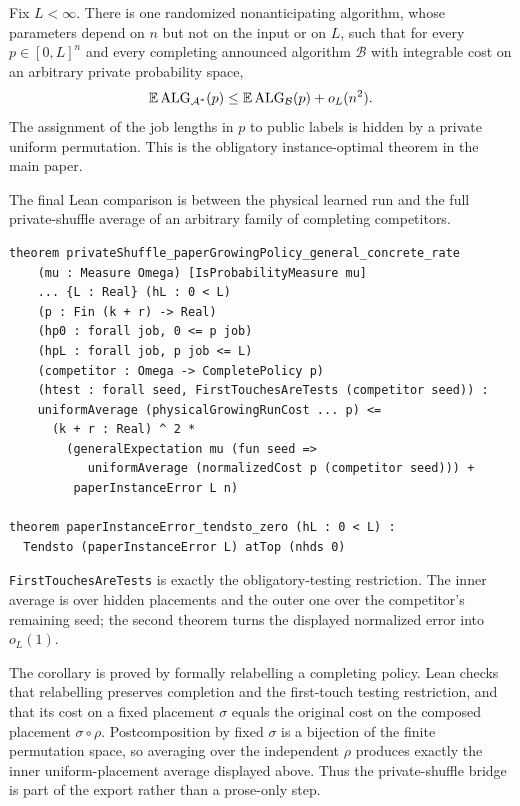 \begin{theorem}
\label{thm:lean-audit-obligatory-instance}
Fix $L<\infty$.  There is one randomized nonanticipating algorithm, whose
parameters depend on $n$ but not on the input or on $L$, such that for every
$p\in[0,L]^n$ and every completing announced algorithm $\mathcal B$ with
integrable cost on an arbitrary private probability space,
\[
 \mathbb{E}\operatorname{ALG}_{\mathcal A^*}(p)
 \le \mathbb{E}\operatorname{ALG}_{\mathcal B}(p)+o_L(n^2).
\]
The assignment of the job lengths in $p$ to public labels is hidden by a private
uniform permutation.  This is the obligatory instance-optimal theorem in the
main paper.
\end{theorem}

The final Lean comparison is between the physical learned run and the full
private-shuffle average of an arbitrary family of completing competitors.

\begin{lstlisting}[style=lean]
theorem privateShuffle_paperGrowingPolicy_general_concrete_rate
    (mu : Measure Omega) [IsProbabilityMeasure mu]
    ... {L : Real} (hL : 0 < L)
    (p : Fin (k + r) -> Real)
    (hp0 : forall job, 0 <= p job)
    (hpL : forall job, p job <= L)
    (competitor : Omega -> CompletePolicy p)
    (htest : forall seed, FirstTouchesAreTests (competitor seed)) :
    uniformAverage (physicalGrowingRunCost ... p) <=
      (k + r : Real) ^ 2 *
        (generalExpectation mu (fun seed =>
           uniformAverage (normalizedCost p (competitor seed))) +
         paperInstanceError L n)

theorem paperInstanceError_tendsto_zero (hL : 0 < L) :
  Tendsto (paperInstanceError L) atTop (nhds 0)
\end{lstlisting}

\texttt{FirstTouchesAreTests} is exactly the obligatory-testing restriction.
The inner average is over hidden placements and the outer one over the
competitor's remaining seed; the second theorem turns the displayed
normalized error into $o_L(1)$.

The corollary is proved by formally relabelling a completing policy.  Lean
checks that relabelling preserves completion and the first-touch testing
restriction, and that its cost on a fixed placement $\sigma$ equals the
original cost on the composed placement $\sigma\circ\rho$.  Postcomposition
by fixed $\sigma$ is a bijection of the finite permutation space, so averaging
over the independent $\rho$ produces exactly the inner uniform-placement
average displayed above.  Thus the private-shuffle bridge is part of the
export rather than a prose-only step.

